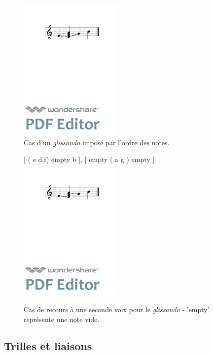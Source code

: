 \documentclass{article}
\newenvironment{gmncode}	{\vspace{-2mm}\small\verbatim}{\endverbatim\vspace{-2mm}}
\begin{document}
\begin{figure}[h]
\centering
\begin{gmncode}
[ \glissando(e {d,f,a} g) b ]
\end{gmncode}
\includegraphics[width=5cm]{img/glissandopb.pdf}
\caption{Cas d'un \emph{glissando} imposé par l'ordre des notes.}
\label{fig:glissandopb}
\end{figure}

\begin{figure}[h]
\centering
\begin{gmncode}
{ 
  [ \glissando( e {d,f}) empty b ],
  [  empty \glissando( a g ) empty ] 
}
\end{gmncode}
\includegraphics[width=5cm]{img/glissandosanspb.pdf}
\caption{Cas de recours à une seconde voix pour le \emph{glissando} -
'empty' représente une note vide.}
\label{fig:glissandosspb}
\end{figure}


\subsection{Trilles et liaisons}\label{subsec:trillesLiaison}
\end{document}
